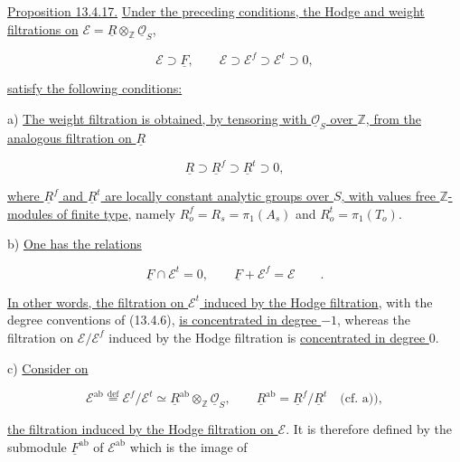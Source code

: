 \medskip
\noindent
\underline{Proposition 13.4.17.} \underline{Under the preceding
conditions, the Hodge and weight filtrations on}
$\mathcal E=\underline R\otimes_{\mathbb Z}\underline{\mathcal O}_S$,

\begin{equation}\tag{13.4.17.1}
 \mathcal E\supset\underline F,
 \qquad
 \mathcal E\supset\mathcal E^f\supset\mathcal E^t\supset0,
\end{equation}

\noindent
\underline{satisfy the following conditions:}

\smallskip
\noindent
a) \underline{The weight filtration is obtained, by tensoring with
$\underline{\mathcal O}_S$ over $\mathbb Z$, from the analogous
filtration on $\underline R$}

\begin{equation*}
 \underline R\supset\underline R^f\supset\underline R^t\supset0,
\end{equation*}

\noindent
\underline{where $\underline R^f$ and $\underline R^t$ are locally
constant analytic groups over $S$, with values free $\mathbb Z$-modules
of finite type}, namely
$R_o^f=R_s=\pi_1(A_s)$ and $R_o^t=\pi_1(T_o)$.

\smallskip
\noindent
b) \underline{One has the relations}

\begin{equation}\tag{*}
 \underline F\cap\mathcal E^t=0,
 \qquad \underline F+\mathcal E^f=\mathcal E\qquad .
\end{equation}

\noindent
\underline{In other words, the filtration on $\mathcal E^t$ induced by
the Hodge filtration}, with the degree conventions of (13.4.6),
\underline{is concentrated in degree $-1$}, whereas the filtration on
$\mathcal E/\mathcal E^f$ induced by the Hodge filtration is
\underline{concentrated in degree $0$}.

\smallskip
\noindent
c) \underline{Consider on}

\begin{equation*}
 \mathcal E^{\mathrm{ab}}
 \stackrel{\mathrm{def}}{=}\mathcal E^f/\mathcal E^t
 \simeq\underline R^{\mathrm{ab}}\otimes_{\mathbb Z}
 \underline{\mathcal O}_S,
 \qquad
 \underline R^{\mathrm{ab}}=\underline R^f/\underline R^t
 \quad\text{(cf. a))},
\end{equation*}

\noindent
\underline{the filtration induced by the Hodge filtration on
$\mathcal E$}.  It is therefore defined by the submodule
$\underline F^{\mathrm{ab}}$ of $\mathcal E^{\mathrm{ab}}$ which is the
image of

